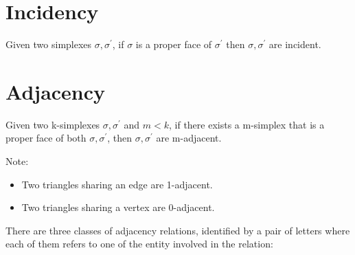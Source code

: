 \section{Incidency}
Given two simplexes $\sigma, \sigma^{'}$, if $\sigma$ is a proper face of $\sigma^{'}$ then $\sigma, \sigma^{'}$ are incident.

\section{Adjacency}
Given two k-simplexes $\sigma, \sigma^{'}$ and $m<k$, if there exists a m-simplex that is a proper face of both $\sigma, \sigma^{'}$, then $\sigma, \sigma^{'}$ are m-adjacent.\par
Note:
\begin{itemize}
    \item Two triangles sharing an edge are 1-adjacent.
    \item Two triangles sharing a vertex are 0-adjacent.
\end{itemize}

There are three classes of adjacency relations, identified by a pair of letters where each of them refers to one of the entity involved in the relation:

